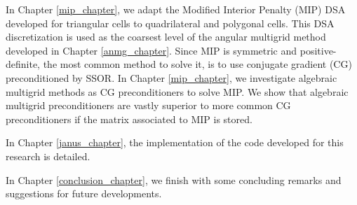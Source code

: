 In Chapter \ref{mip_chapter}, we adapt the Modified Interior 
Penalty (MIP) DSA developed for triangular cells to quadrilateral and polygonal 
cells. This DSA discretization is used as the coarsest level of the angular 
multigrid method developed in Chapter \ref{anmg_chapter}. Since MIP is
symmetric and positive-definite, the most common method to solve it, is to use
conjugate gradient (CG) preconditioned by SSOR. In Chapter \ref{mip_chapter}, we 
investigate algebraic multigrid methods as CG preconditioners to solve MIP. 
We show that algebraic multigrid preconditioners are vastly superior to more
common CG preconditioners if the matrix associated to MIP is stored.

In Chapter \ref{janus_chapter}, the implementation of the code
developed for this research is detailed.

In Chapter \ref{conclusion_chapter}, we finish with some concluding 
remarks and suggestions for future developments.

